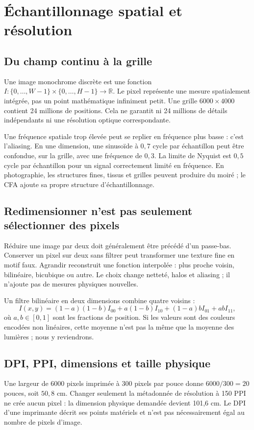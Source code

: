 \section{Échantillonnage spatial et résolution}
\subsection{Du champ continu à la grille}
Une image monochrome discrète est une fonction
$I:\{0,\ldots,W-1\}\times\{0,\ldots,H-1\}\to\mathbb R$.
Le pixel représente une mesure spatialement intégrée, pas un point
mathématique infiniment petit. Une grille $6000\times4000$ contient
24 millions de positions. Cela ne garantit ni 24 millions de détails
indépendants ni une résolution optique correspondante.

Une fréquence spatiale trop élevée peut se replier en fréquence
plus basse : c'est l'aliasing. En une dimension, une sinusoïde à
$0{,}7$ cycle par échantillon peut être confondue, sur la grille,
avec une fréquence de $0{,}3$. La limite de Nyquist est $0{,}5$ cycle
par échantillon pour un signal correctement limité en fréquence.
En photographie, les structures fines, tissus et grilles peuvent
produire du moiré ; le CFA ajoute sa propre structure d'échantillonnage.

\subsection{Redimensionner n'est pas seulement sélectionner des pixels}
Réduire une image par deux doit généralement être précédé d'un
passe-bas. Conserver un pixel sur deux sans filtrer peut transformer
une texture fine en motif faux. Agrandir reconstruit une fonction
interpolée : plus proche voisin, bilinéaire, bicubique ou autre.
Le choix change netteté, halos et aliasing ; il n'ajoute pas de
mesures physiques nouvelles.

Un filtre bilinéaire en deux dimensions combine quatre voisins :
\begin{equation}
I(x,y)=(1-a)(1-b)I_{00}+a(1-b)I_{10}
+(1-a)bI_{01}+abI_{11},
\end{equation}
où $a,b\in[0,1]$ sont les fractions de position. Si les valeurs sont
des couleurs encodées non linéaires, cette moyenne n'est pas la
même que la moyenne des lumières ; nous y reviendrons.

\subsection{DPI, PPI, dimensions et taille physique}
Une largeur de 6000 pixels imprimée à 300 pixels par pouce donne
$6000/300=20$ pouces, soit $50{,}8$ cm. Changer seulement la métadonnée
de résolution à 150 PPI ne crée aucun pixel : la dimension physique
demandée devient 101,6 cm. Le DPI d'une imprimante décrit ses points
matériels et n'est pas nécessairement égal au nombre de pixels d'image.

